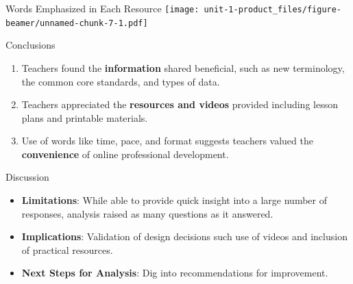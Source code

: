 \documentclass[
  ignorenonframetext,
]{beamer}
\providecommand{\tightlist}{%
  \setlength{\itemsep}{0pt}\setlength{\parskip}{0pt}}
\begin{document}
\begin{frame}{Words Emphasized in Each Resource}
\protect\hypertarget{words-emphasized-in-each-resource}{}
\texttt{[image: unit-1-product\_files/figure-beamer/unnamed-chunk-7-1.pdf]}
\end{frame}

\begin{frame}{Conclusions}
\protect\hypertarget{conclusions}{}
\begin{enumerate}
\tightlist
\item
  Teachers found the \textbf{information} shared beneficial, such as new
  terminology, the common core standards, and types of data.
\item
  Teachers appreciated the \textbf{resources and videos} provided
  including lesson plans and printable materials.
\item
  Use of words like time, pace, and format suggests teachers valued the
  \textbf{convenience} of online professional development.
\end{enumerate}
\end{frame}

\begin{frame}{Discussion}
\protect\hypertarget{discussion}{}
\begin{itemize}
\tightlist
\item
  \textbf{Limitations}: While able to provide quick insight into a large
  number of responses, analysis raised as many questions as it
  answered.\\
\item
  \textbf{Implications}: Validation of design decisions such use of
  videos and inclusion of practical resources.\\
\item
  \textbf{Next Steps for Analysis}: Dig into recommendations for
  improvement.
\end{itemize}
\end{frame}
\end{document}
